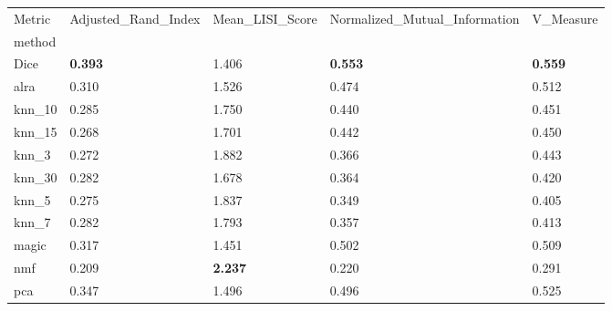 \begin{tabular}{lllll}
\toprule
Metric & Adjusted_Rand_Index & Mean_LISI_Score & Normalized_Mutual_Information & V_Measure \\
method &  &  &  &  \\
\midrule
Dice & \textbf{0.393} & 1.406 & \textbf{0.553} & \textbf{0.559} \\
alra & 0.310 & 1.526 & 0.474 & 0.512 \\
knn_10 & 0.285 & 1.750 & 0.440 & 0.451 \\
knn_15 & 0.268 & 1.701 & 0.442 & 0.450 \\
knn_3 & 0.272 & 1.882 & 0.366 & 0.443 \\
knn_30 & 0.282 & 1.678 & 0.364 & 0.420 \\
knn_5 & 0.275 & 1.837 & 0.349 & 0.405 \\
knn_7 & 0.282 & 1.793 & 0.357 & 0.413 \\
magic & 0.317 & 1.451 & 0.502 & 0.509 \\
nmf & 0.209 & \textbf{2.237} & 0.220 & 0.291 \\
pca & 0.347 & 1.496 & 0.496 & 0.525 \\
\bottomrule
\end{tabular}
